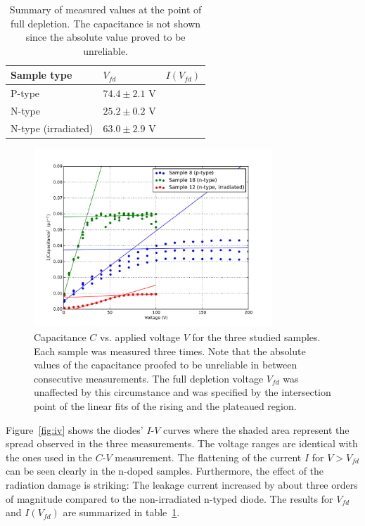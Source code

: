 \documentclass[11pt,a4paper]{report}
\begin{document}
\begin{table}
  \caption{Summary of measured values at the point of full depletion. The capacitance is not shown since the absolute value proved to be unreliable.}\label{tab:results}
  \centering
  \begin{tabular}{lll}
    \toprule
    Sample type         & $V_{fd}$ & $I(V_{fd})$ \\
    \midrule
    P-type              & $74.4 \pm 2.1$ V   &           \\
    N-type              & $25.2 \pm 0.2$ V   &           \\
    N-type (irradiated) & $63.0 \pm 2.9$ V   &           \\
    \bottomrule
  \end{tabular}
\end{table}



\label{sec:results}
\begin{figure}
  \centering
  \includegraphics[width=0.8\textwidth]{./figures/cv.pdf}  
  \caption{Capacitance $C$ vs. applied voltage $V$ for the three studied samples. Each sample was measured three times. Note that the absolute values of the capacitance proofed to be unreliable in between consecutive measurements. The full depletion voltage $V_{fd}$ was unaffected by this circumstance and was specified by the intersection point of the linear fits of the rising and the plateaued region.}\label{fig:cv}
\end{figure}

Figure~\ref{fig:iv} shows the diodes' $I$-$V$ curves where the shaded area represent the spread observed in the three measurements.
The voltage ranges are identical with the ones used in the $C$-$V$ measurement.
The flattening of the current $I$ for $V>V_{fd}$ can be seen clearly in the n-doped samples.
Furthermore, the effect of the radiation damage is striking: The leakage current increased by about three orders of magnitude compared to the non-irradiated n-typed diode.
The results for $V_{fd}$ and $I(V_{fd})$  are summarized in table~\ref{tab:results}.
\end{document}
